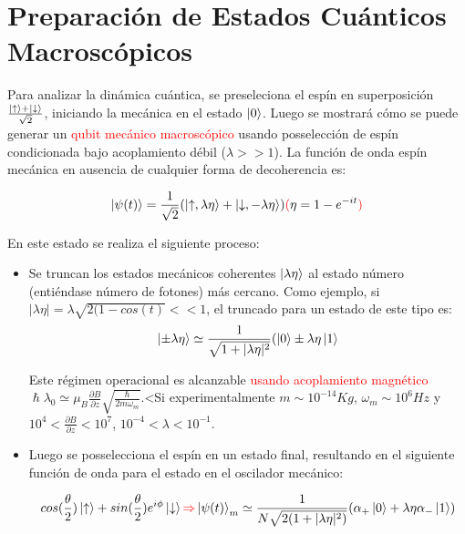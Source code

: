 \documentclass{book}
\begin{document}
\section{Preparación de Estados Cuánticos Macroscópicos}

Para analizar la dinámica cuántica, se preseleciona el espín en superposición $\frac{\ket{\uparrow}+\ket{\downarrow}}{\sqrt{2}}$, iniciando la mecánica en el estado $\ket{0}$. Luego se mostrará cómo se puede generar un \textcolor{red}{qubit mecánico macroscópico} usando posselección de espín condicionada bajo acoplamiento débil ($\lambda >>1$). La función de onda espín mecánica en ausencia de cualquier forma de decoherencia es:

\begin{equation}\label{eq10.4}\ket{\psi(t)}=\frac{1}{\sqrt{2}}(\ket{\uparrow,\lambda\eta}+\ket{\downarrow,-\lambda\eta}) \textcolor{red}{(}\eta=1-e^{-it}\textcolor{red}{)}\end{equation}

En este estado se realiza el siguiente proceso:

\begin{itemize}
    \item Se truncan los estados mecánicos coherentes $\ket{\lambda\eta}$ al estado número (entiéndase número de fotones) más cercano. Como ejemplo, si $\lvert\lambda\eta\rvert=\lambda\sqrt{2(1-cos(t)} <<1$, el truncado para un estado de este tipo es:
\begin{equation}\label{eq10.5} \ket{\pm\lambda\eta}\simeq\frac{1}{\sqrt{1+\lvert\lambda\eta\rvert^2}}(\ket{0}\pm\lambda\eta\ket{1}\end{equation}

Este régimen operacional es alcanzable \textcolor{red}{usando acoplamiento magnético} $\hslash\lambda_0\simeq \mu_B\frac{\partial B}{\partial z}\sqrt{\frac{\hslash}{2m\omega_m}}$.<Si experimentalmente $m\sim 10^{-14}Kg$, $\omega_m\sim 10^6 Hz$ y $10^4<\frac{\partial B}{\partial z}<10^7$, $10^{-4}<\lambda<10^{-1}$.
    \item Luego se posselecciona el espín en un estado final, resultando en el siguiente función de onda para el estado en el oscilador mecánico:
    
\begin{equation}\label{eq10.6}cos(\frac{\theta}{2})\ket{\uparrow}+sin(\frac{\theta}{2})e^{i\phi}\ket{\downarrow}\textcolor{red}{\Rightarrow}\ket{\psi(t)}_m\simeq\frac{1}{N\sqrt{2(1+\lvert\lambda\eta\rvert^2)}}(\alpha_+\ket{0}+\lambda\eta\alpha_-\ket{1})\end{equation}
\end{itemize}
\end{document}
